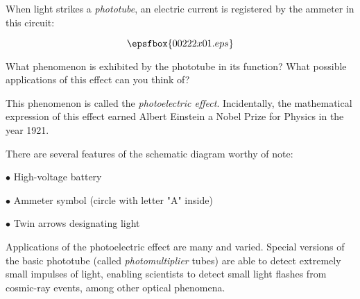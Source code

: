

When light strikes a {\it phototube}, an electric current is registered by the ammeter in this circuit:

$$\epsfbox{00222x01.eps}$$

What phenomenon is exhibited by the phototube in its function?  What possible applications of this effect can you think of?







This phenomenon is called the {\it photoelectric effect}.  Incidentally, the mathematical expression of this effect earned Albert Einstein a Nobel Prize for Physics in the year 1921.







There are several features of the schematic diagram worthy of note:

\medskip
\item{$\bullet$} High-voltage battery
\item{$\bullet$} Ammeter symbol (circle with letter "A" inside)
\item{$\bullet$} Twin arrows designating light
\medskip

Applications of the photoelectric effect are many and varied.  Special versions of the basic phototube (called {\it photomultiplier} tubes) are able to detect extremely small impulses of light, enabling scientists to detect small light flashes from cosmic-ray events, among other optical phenomena.




